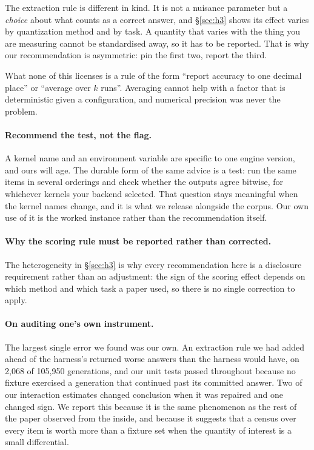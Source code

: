 \documentclass[conference]{IEEEtran}
\begin{document}
The extraction rule is different in kind. It is not a nuisance parameter but a
\emph{choice} about what counts as a correct answer, and \S\ref{sec:h3} shows its effect
varies by quantization method and by task. A quantity that varies with the thing you are
measuring cannot be standardised away, so it has to be reported. That is why our
recommendation is asymmetric: pin the first two, report the third.

What none of this licenses is a rule of the form ``report accuracy to one decimal place''
or ``average over $k$ runs''. Averaging cannot help with a factor that is deterministic
given a configuration, and numerical precision was never the problem.

\paragraph{Recommend the test, not the flag.}
A kernel name and an environment variable are specific to one engine version, and ours
will age. The durable form of the same advice is a test: run the same items in several
orderings and check whether the outputs agree bitwise, for whichever kernels your backend
selected. That question stays meaningful when the kernel names change, and it is what we
release alongside the corpus. Our own use of it is the worked instance rather than the
recommendation itself.

\paragraph{Why the scoring rule must be reported rather than corrected.}
The heterogeneity in \S\ref{sec:h3} is why every recommendation here is a
disclosure requirement rather than an adjustment: the sign of the scoring effect
depends on which method and which task a paper used, so there is no single
correction to apply.

\paragraph{On auditing one's own instrument.}
The largest single error we found was our own. An extraction rule we had added
ahead of the harness's returned worse answers than the harness would have, on
2{,}068 of 105{,}950 generations, and our unit tests passed throughout because no
fixture exercised a generation that continued past its committed answer. Two of
our interaction estimates changed conclusion when it was repaired and one changed
sign. We report this because it is the same phenomenon as the rest of the paper
observed from the inside, and because it suggests that a census over every item is
worth more than a fixture set when the quantity of interest is a small
differential.
\end{document}
